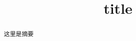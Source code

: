 \documentclass{myclass}
\title{title}
\begin{document}
\begin{abstract}
这里是摘要
\end{abstract}







\end{document}
